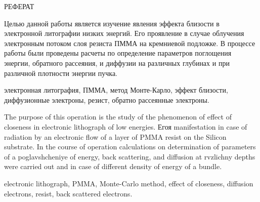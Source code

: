 \begin{center}
РЕФЕРАТ
\end{center}

Целью данной работы является изучение явления эффекта близости в электронной литографии низких энергий.
Его проявление в случае облучения электронным потоком слоя резиста ПММА на кремниевой подложке. В процессе работы были проведены расчеты по определение параметров поглощения энергии, обратного рассеяния, и диффузии на различных глубинах и при различной плотности энергии пучка.
\vspace*{1cm}

\hspace{-1.25cm}электронная литография, ПММА, метод Монте-Карло, эффект близости, диффузионные электроны, резист, обратно рассеянные электроны.
 \vspace*{1cm}

The purpose of this operation is the study of the phenomenon of effect of closeness in electronic lithograph of low energies.
Егоя manifestation in case of radiation by an electronic flow of a layer of PMMA resist on the Silicon substrate. In the course of operation calculations on determination of parameters of a poglavshcheniye of energy, back scattering, and diffusion at rvzlichny depths were carried out and in case of different density of energy of a bundle.
\vspace*{1cm}

\hspace{-1.25cm}electronic lithograph, PMMA, Monte-Carlo method, effect of closeness, diffusion electrons, resist, back scattered electrons.
